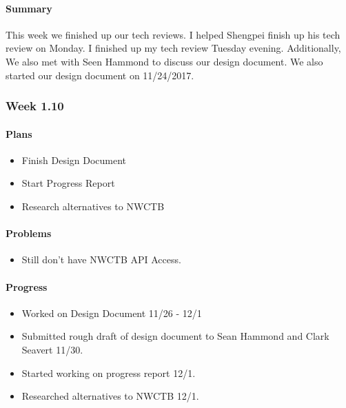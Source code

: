 \documentclass[onecolumn, draftclsnofoot,10pt, compsoc]{article}
\begin{document}
		    \paragraph{Summary} \hfill \break
		         This week we finished up our tech reviews. I helped Shengpei finish up his tech review on Monday. I finished up my tech review Tuesday evening. Additionally, We also met with Seen Hammond to discuss our design document. We also started our design document on 11/24/2017.\\
		
		\subsubsection{Week 1.10}
		
		    \paragraph{Plans} \hfill \break
		        \begin{itemize}
		            \item Finish Design Document
		            \item Start Progress Report
		            \item Research alternatives to NWCTB
		        \end{itemize}
		
		    \paragraph{Problems} \hfill \break
		        \begin{itemize}
		            \item Still don't have NWCTB API Access.
		        \end{itemize}
		
		    \paragraph{Progress} \hfill \break
		        \begin{itemize}
		            \item Worked on Design Document 11/26 - 12/1
		            \item Submitted rough draft of design document to Sean Hammond and Clark Seavert 11/30.
		            \item Started working on progress report 12/1.
		            \item Researched alternatives to NWCTB 12/1.
		        \end{itemize}
		        
\end{document}
